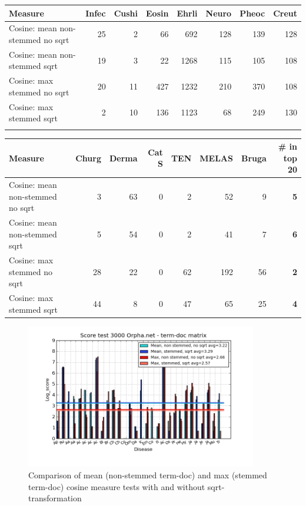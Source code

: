 \begin{table}[H]
  \begin{tiny}
  \label{testResult}
  \begin{tabular}{|l|r|r|r|r|r|r|r|}
    \hline
    Measure &Infec&Cushi&Eosin&Ehrli&Neuro&Pheoc&Creut \\
    \hline
    Cosine: mean non-stemmed no sqrt &25&2&66&692&128&139&128 \\
    \hline
    Cosine: mean non-stemmed sqrt &19&3&22&1268&115&105&108 \\
    \hline
    Cosine: max stemmed no sqrt &20&11&427&1232&210&370&108 \\
    \hline
    Cosine: max stemmed sqrt &2&10&136&1123&68&249&130 \\
    \hline
  \multicolumn{8}{c}{} \\
  \end{tabular}
  \begin{tabular}{|l|r|r|r|r|r|r|r|}
    \hline
    Measure &Churg&Derma&Cat S&TEN&MELAS&Bruga& \scriptsize{\textbf{\# in top 20}} \\
    \hline
    Cosine: mean non-stemmed no sqrt &3&63&0&2&52&9 &\scriptsize{\textbf{5}} \\
    \hline
    Cosine: mean non-stemmed sqrt &5&54&0&2&41&7 &\scriptsize{\textbf{6}}\\
    \hline
    Cosine: max stemmed no sqrt &28&22&0&62&192&56 & \scriptsize{\textbf{2}} \\
    \hline
    Cosine: max stemmed sqrt &44&8&0&47&65&25 & \scriptsize{\textbf{4}} \\
    \hline
  \end{tabular}
  \end{tiny}
\end{table}

\begin{figure}[H]
        \begin{center}
          \includegraphics[width=0.9\textwidth]{barcharts/termDoc_orphan_hist_3000_ns_mea_ns_mea_sqr_s_max_s_max_sqr.png}
        \end{center}
        \caption{Comparison of mean (non-stemmed term-doc) and max (stemmed term-doc) cosine measure tests with and without sqrt-transformation}
        \label{termDoc_orphan_hist_3000_ns_mea_ns_mea_sqr_s_max_s_max_sqr}
\end{figure}

